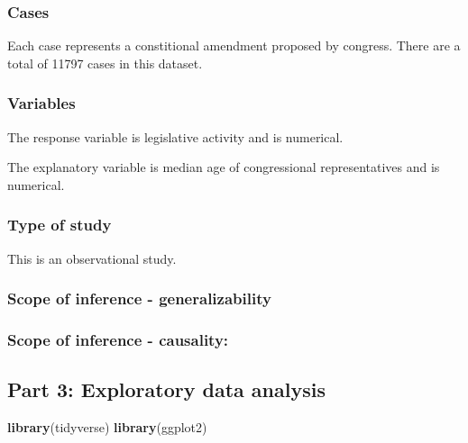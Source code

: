 \documentclass[]{article}
\newenvironment{Shaded}{\begin{snugshade}}{\end{snugshade}}
\newcommand{\KeywordTok}[1]{\textcolor[rgb]{0.13,0.29,0.53}{\textbf{#1}}}
\newcommand{\NormalTok}[1]{#1}
\begin{document}
\subsubsection{Cases}\label{cases}

Each case represents a constitional amendment proposed by congress.
There are a total of 11797 cases in this dataset.

\subsubsection{Variables}\label{variables}

The response variable is legislative activity and is numerical.

The explanatory variable is median age of congressional representatives
and is numerical.

\subsubsection{Type of study}\label{type-of-study}

This is an observational study.

\subsubsection{Scope of inference -
generalizability}\label{scope-of-inference---generalizability}

\subsubsection{Scope of inference -
causality:}\label{scope-of-inference---causality}

\subsection{Part 3: Exploratory data
analysis}\label{part-3-exploratory-data-analysis}

\begin{Shaded}
\begin{Highlighting}[]
\KeywordTok{library}\NormalTok{(tidyverse)}
\KeywordTok{library}\NormalTok{(ggplot2)}
\end{Highlighting}
\end{Shaded}
\end{document}
